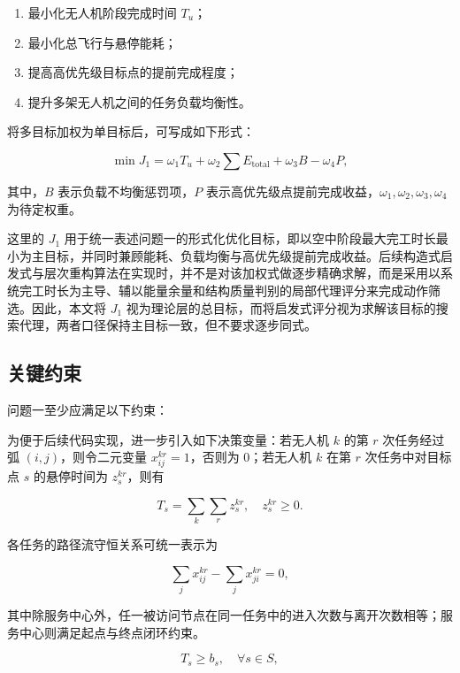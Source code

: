 \documentclass[12pt]{article}
\begin{document}
\begin{enumerate}
	\item 最小化无人机阶段完成时间 $T_u$；
	\item 最小化总飞行与悬停能耗；
	\item 提高高优先级目标点的提前完成程度；
	\item 提升多架无人机之间的任务负载均衡性。
\end{enumerate}

将多目标加权为单目标后，可写成如下形式：

\begin{equation}
\min J_1 = \omega_1 T_u + \omega_2 \sum E_{\text{total}} + \omega_3 B - \omega_4 P,
\end{equation}

其中，$B$ 表示负载不均衡惩罚项，$P$ 表示高优先级点提前完成收益，$\omega_1,\omega_2,\omega_3,\omega_4$ 为待定权重。

这里的 $J_1$ 用于统一表述问题一的形式化优化目标，即以空中阶段最大完工时长最小为主目标，并同时兼顾能耗、负载均衡与高优先级提前完成收益。后续构造式启发式与层次重构算法在实现时，并不是对该加权式做逐步精确求解，而是采用以系统完工时长为主导、辅以能量余量和结构质量判别的局部代理评分来完成动作筛选。因此，本文将 $J_1$ 视为理论层的总目标，而将启发式评分视为求解该目标的搜索代理，两者口径保持主目标一致，但不要求逐步同式。

\subsection{关键约束}
问题一至少应满足以下约束：

为便于后续代码实现，进一步引入如下决策变量：若无人机 $k$ 的第 $r$ 次任务经过弧 $(i,j)$，则令二元变量 $x_{ij}^{kr}=1$，否则为 0；若无人机 $k$ 在第 $r$ 次任务中对目标点 $s$ 的悬停时间为 $z_s^{kr}$，则有

\begin{equation}
T_s = \sum_k \sum_r z_s^{kr}, \quad z_s^{kr} \ge 0.
\end{equation}

各任务的路径流守恒关系可统一表示为

\begin{equation}
\sum_j x_{ij}^{kr} - \sum_j x_{ji}^{kr} = 0,
\end{equation}

其中除服务中心外，任一被访问节点在同一任务中的进入次数与离开次数相等；服务中心则满足起点与终点闭环约束。

\begin{equation}
T_s \ge b_s, \quad \forall s \in S,
\end{equation}
\end{document}

